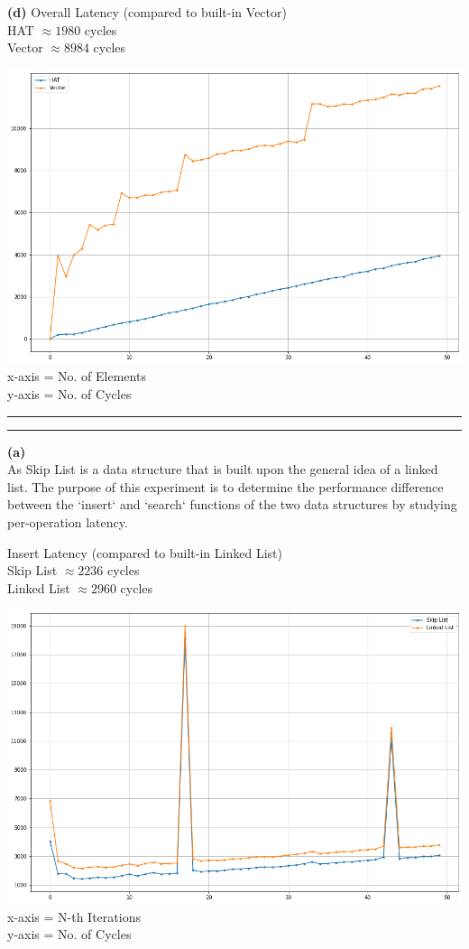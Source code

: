 \documentclass[a4paper, 11pt]{article}
\newcommand{\question}[2] {\vspace{.25in} \hrule\vspace{0.5em}
\noindent{\bf #1: #2} \vspace{0.5em}
\hrule \vspace{.10in}}
\renewcommand{\part}[1] {\vspace{.10in} {\bf (#1)}}
\begin{document}
\part{d}
Overall Latency (compared to built-in Vector) \\
HAT $\approx 1980$ cycles \\
Vector $\approx 8984$ cycles
\begin{center}
  \includegraphics[width=15cm]{p1d}
  x-axis = No. of Elements\\
  y-axis = No. of Cycles
\end{center}

\question{3}{\textit{Skip Lists}}
\part{a} \\
As Skip List is a data structure that is built upon the general idea of a linked list. The purpose of this experiment is to determine the 
performance difference between the `insert` and `search` functions of the two data structures by studying per-operation latency.

Insert Latency (compared to built-in Linked List) \\
Skip List $\approx 2236$ cycles \\
Linked List $\approx 2960$ cycles

\begin{center}
  \includegraphics[width=15cm]{p3a1}
  x-axis = N-th Iterations\\
  y-axis = No. of Cycles
\end{center}
\end{document}
